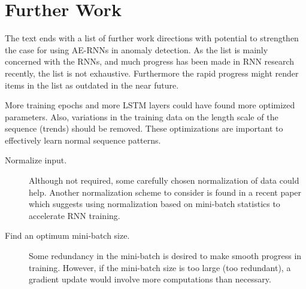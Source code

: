 \section{Further Work}

The text ends with a list of further work directions with potential to strengthen the case for using AE-RNNs in anomaly detection.
%
As the list is mainly concerned with the RNNs, and much progress has been made in RNN research recently, the list is not exhaustive.
%
Furthermore the rapid progress might render items in the list as outdated in the near future.


\begin{description}[style=unboxed]


\item[Better optimize presented work.]

More training epochs and more LSTM layers could have found more optimized parameters.
%
Also, variations in the training data on the length scale of the sequence (trends) should be removed.
%
These optimizations are important to effectively learn normal sequence patterns.


\item[Accelerate training.]  \hfill %

                 \begin{description}


                 \item[Normalize input.]

                 Although not required, some carefully chosen normalization of data could help.
                 Another normalization scheme to consider is found in a recent paper \cite{laurent2015batch} which suggests using normalization based on mini-batch statistics to accelerate RNN training.
                 

                 \item[Find an optimum mini-batch size.]
                 
                 Some redundancy in the mini-batch is desired to make smooth progress in training.
                 However, if the mini-batch size is too large (too redundant), a gradient update would involve more computations than necessary.
                          
                 \end{description}


\end{description}

